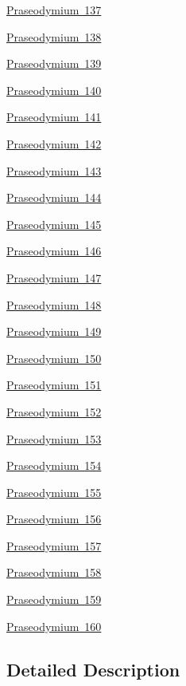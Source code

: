 \begin{DoxyCompactItemize}
\mbox{\hyperlink{group___isotope_const-_praseodymium-_pr137}{Praseodymium 137}}
\item 
\mbox{\hyperlink{group___isotope_const-_praseodymium-_pr138}{Praseodymium 138}}
\item 
\mbox{\hyperlink{group___isotope_const-_praseodymium-_pr139}{Praseodymium 139}}
\item 
\mbox{\hyperlink{group___isotope_const-_praseodymium-_pr140}{Praseodymium 140}}
\item 
\mbox{\hyperlink{group___isotope_const-_praseodymium-_pr141}{Praseodymium 141}}
\item 
\mbox{\hyperlink{group___isotope_const-_praseodymium-_pr142}{Praseodymium 142}}
\item 
\mbox{\hyperlink{group___isotope_const-_praseodymium-_pr143}{Praseodymium 143}}
\item 
\mbox{\hyperlink{group___isotope_const-_praseodymium-_pr144}{Praseodymium 144}}
\item 
\mbox{\hyperlink{group___isotope_const-_praseodymium-_pr145}{Praseodymium 145}}
\item 
\mbox{\hyperlink{group___isotope_const-_praseodymium-_pr146}{Praseodymium 146}}
\item 
\mbox{\hyperlink{group___isotope_const-_praseodymium-_pr147}{Praseodymium 147}}
\item 
\mbox{\hyperlink{group___isotope_const-_praseodymium-_pr148}{Praseodymium 148}}
\item 
\mbox{\hyperlink{group___isotope_const-_praseodymium-_pr149}{Praseodymium 149}}
\item 
\mbox{\hyperlink{group___isotope_const-_praseodymium-_pr150}{Praseodymium 150}}
\item 
\mbox{\hyperlink{group___isotope_const-_praseodymium-_pr151}{Praseodymium 151}}
\item 
\mbox{\hyperlink{group___isotope_const-_praseodymium-_pr152}{Praseodymium 152}}
\item 
\mbox{\hyperlink{group___isotope_const-_praseodymium-_pr153}{Praseodymium 153}}
\item 
\mbox{\hyperlink{group___isotope_const-_praseodymium-_pr154}{Praseodymium 154}}
\item 
\mbox{\hyperlink{group___isotope_const-_praseodymium-_pr155}{Praseodymium 155}}
\item 
\mbox{\hyperlink{group___isotope_const-_praseodymium-_pr156}{Praseodymium 156}}
\item 
\mbox{\hyperlink{group___isotope_const-_praseodymium-_pr157}{Praseodymium 157}}
\item 
\mbox{\hyperlink{group___isotope_const-_praseodymium-_pr158}{Praseodymium 158}}
\item 
\mbox{\hyperlink{group___isotope_const-_praseodymium-_pr159}{Praseodymium 159}}
\item 
\mbox{\hyperlink{group___isotope_const-_praseodymium-_pr160}{Praseodymium 160}}
\end{DoxyCompactItemize}


\subsection{Detailed Description}
